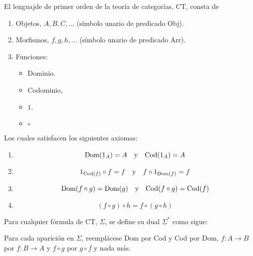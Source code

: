 \documentclass[12pt]{report}
\newcounter{it}
\theoremstyle{largebreak}
\newcommand\cf[3]{\ensuremath{#1:#2\rightarrow#3}}
\begin{document}
    \begin{mydef}
        El lenguajde de primer orden de la teoría de categorías, CT, consta de
        \begin{enumerate}
            \item Objetos, $A,B,C,...$ (símbolo unario de predicado Obj).
            \item Morfismos, $f,g,h,...$ (símbolo unario de predicado Arr).
            \item Funciones:
            \begin{itemize}
                \item Dominio.
                \item Codominio,
                \item $1$.
                \item $\circ$
            \end{itemize}
        \end{enumerate}
        Los cuales satisfacen los siguientes axiomas:
        \begin{enumerate}
            \item \begin{equation*}
                \textup{Dom}(1_A)=A\quad\textup{y}\quad \textup{Cod}(1_A)=A
            \end{equation*}
            \item \begin{equation*}
                1_{ \textup{Cod}(f)}\circ f=f\quad\textup{y}\quad f\circ 1_{\textup{Dom}(f)}=f
            \end{equation*}
            \item \begin{equation*}
                \textup{Dom}(f\circ g)=\textup{Dom}(g)\quad\textup{y}\quad\textup{Cod}(f\circ g)=\textup{Cod}(f)
            \end{equation*}
            \item \begin{equation*}
                (f\circ g)\circ h=f\circ (g\circ h)
            \end{equation*}
        \end{enumerate}
        Para cualquier fórmula de CT, $\Sigma$, se define su dual $\Sigma^*$ como sigue:

        Para cada aparición en $\Sigma$, reemplácese Dom por Cod y Cod por Dom, $\cf{f}{A}{B}$ por $\cf{f}{B}{A}$ y $f\circ g$ por $g\circ f$ y nada más.
    \end{mydef}
\end{document}
